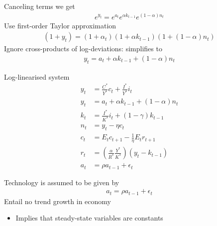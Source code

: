 \documentclass{beamer}
\begin{document}
\begin{frame}
  Canceling terms we get 
  \begin{align}
    e^{y_t}=e^{a_t}e^{\alpha k_{t-1}}e^{(1-\alpha)n_t} 
  \end{align}
  \medskip
  Use first-order Taylor approximation
\begin{align}
  (1+y_t)=(1+\alpha_t)(1+\alpha k_{t-1})(1+(1-\alpha)n_t)
\end{align}
\medskip
Ignore cross-products of log-deviations: simplifies to
 \begin{align} 
   y_t=a_t+\alpha k_{t-1} + (1-\alpha)n_t 
\end{align}
\end{frame}


\begin{frame}
  Log-linearised system
  \begin{align*}
  y_t &= \frac{C^*}{Y^*}c_t + \frac{I^*}{Y^*}i_t\\
  y_t &= a_t + \alpha k_{t-1} + (1-\alpha)n_t\\
  k_t &= \frac{I^*}{K^*}i_t + (1-\gamma)k_{t-1}\\
  n_t &= y_t-\eta c_t\\
  c_t &= E_tc_{t+1} - \frac{1}{\eta}E_t r_{t+1}\\
  r_t &= \left(\frac{\alpha}{R^*}\frac{Y^*}{K^*} \right)(y_t-k_{t-1})\\
  a_t &= \rho a_{t-1} + \epsilon_t
 \end{align*}
\end{frame}

\begin{frame}
 Technology is assumed to be given by
 \begin{align}
   a_t=\rho a_{t-1} + \epsilon_t
 \end{align}
  Entail no trend growth in economy
  \begin{itemize}
    \item Implies that steady-state variables are constants
  \end{itemize} 
\end{frame}
\end{document}
